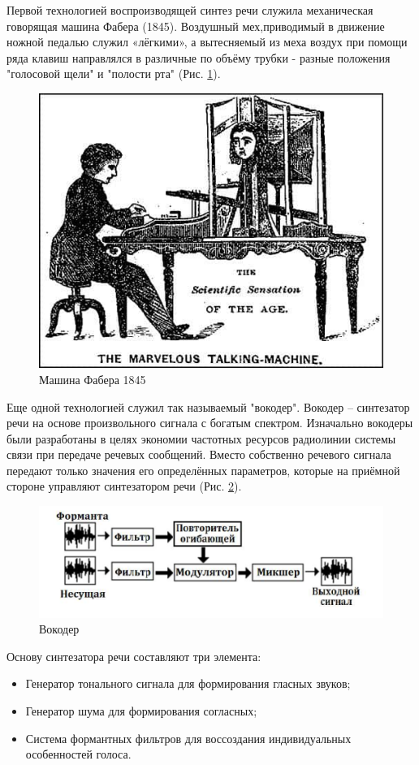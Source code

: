 Первой технологией воспроизводящей синтез речи служила механическая говорящая машина Фабера (1845).
Воздушный мех,приводимый в движение ножной педалью служил «лёгкими», а вытесняемый из меха
воздух при помощи ряда клавиш направлялся в различные по объёму трубки - разные положения "голосовой щели" и "полости рта" (Рис. \ref{pic:faber_machine.png}).


\begin{figure}[h]
	\includegraphics[width=0.75\columnwidth]{./img/faber_machine.png}
	\centering
	\caption{Машина Фабера 1845}
	\label{pic:faber_machine.png}
	\end{figure}

Еще одной технологией служил так называемый "вокодер".  
Вокодер – синтезатор речи на основе
произвольного сигнала с богатым спектром.
Изначально вокодеры были разработаны в целях
экономии частотных ресурсов радиолинии
системы связи при передаче речевых сообщений.
Вместо собственно речевого сигнала передают
только значения его определённых параметров,
которые на приёмной стороне управляют
синтезатором речи (Рис. \ref{pic:vocoder.png}).


\begin{figure}[h]
	\includegraphics[width=0.75\columnwidth]{./img/vocoder.png}
	\centering
	\caption{Вокодер}
	\label{pic:vocoder.png}
	\end{figure}

Основу синтезатора речи составляют три
элемента:
\begin{itemize}
	\item Генератор тонального сигнала для формирования гласных звуков;
	\item Генератор шума для формирования согласных;
	\item Система формантных фильтров для воссоздания
	индивидуальных особенностей голоса.
\end{itemize}

